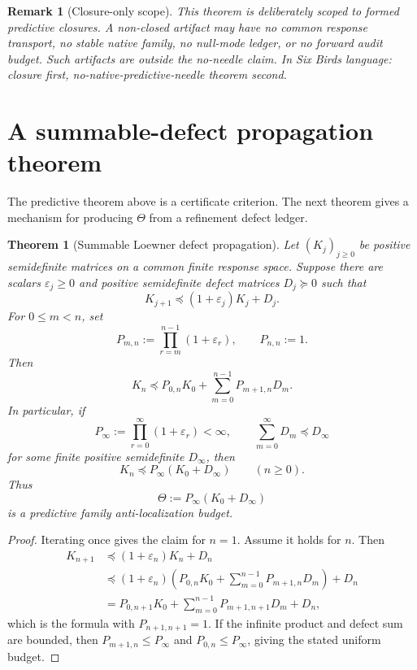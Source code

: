 \documentclass[11pt]{article}
\newtheorem{theorem}{Theorem}
\newtheorem{remark}{Remark}
\begin{document}
\begin{remark}[Closure-only scope]
This theorem is deliberately scoped to formed predictive closures. A non-closed artifact may have no common response transport, no stable native family, no null-mode ledger, or no forward audit budget. Such artifacts are outside the no-needle claim. In Six Birds language: closure first, no-native-predictive-needle theorem second.
\end{remark}

\section{A summable-defect propagation theorem}

The predictive theorem above is a certificate criterion. The next theorem gives a mechanism for producing \(\Theta\) from a refinement defect ledger.

\begin{theorem}[Summable Loewner defect propagation]
Let \((K_j)_{j\ge0}\) be positive semidefinite matrices on a common finite response space. Suppose there are scalars \(\varepsilon_j\ge0\) and positive semidefinite defect matrices \(D_j\succeq0\) such that
\[
K_{j+1}\preceq (1+\varepsilon_j)K_j+D_j.
\]
For \(0\le m<n\), set
\[
P_{m,n}:=\prod_{r=m}^{n-1}(1+\varepsilon_r),
\qquad P_{n,n}:=1.
\]
Then
\[
K_n\preceq P_{0,n}K_0+\sum_{m=0}^{n-1}P_{m+1,n}D_m.
\]
In particular, if
\[
P_\infty:=\prod_{r=0}^\infty(1+\varepsilon_r)<\infty,
\qquad \sum_{m=0}^\infty D_m\preceq D_\infty
\]
for some finite positive semidefinite \(D_\infty\), then
\[
K_n\preceq P_\infty(K_0+D_\infty)
\qquad(n\ge0).
\]
Thus
\[
\Theta:=P_\infty(K_0+D_\infty)
\]
is a predictive family anti-localization budget.
\end{theorem}

\begin{proof}
Iterating once gives the claim for \(n=1\). Assume it holds for \(n\). Then
\begin{align*}
K_{n+1}
&\preceq (1+\varepsilon_n)K_n+D_n\\
&\preceq (1+\varepsilon_n)\left(P_{0,n}K_0+\sum_{m=0}^{n-1}P_{m+1,n}D_m\right)+D_n\\
&=P_{0,n+1}K_0+\sum_{m=0}^{n-1}P_{m+1,n+1}D_m+D_n,
\end{align*}
which is the formula with \(P_{n+1,n+1}=1\). If the infinite product and defect sum are bounded, then \(P_{m+1,n}\le P_\infty\) and \(P_{0,n}\le P_\infty\), giving the stated uniform budget.
\end{proof}
\end{document}
